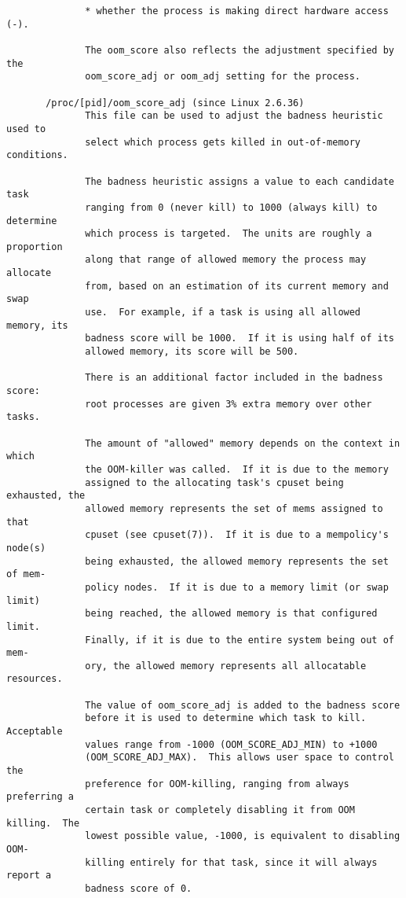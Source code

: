 \documentclass[]{article}
\begin{document}
\begin{verbatim}
              * whether the process is making direct hardware access (-).

              The oom_score also reflects the adjustment specified by the
              oom_score_adj or oom_adj setting for the process.

       /proc/[pid]/oom_score_adj (since Linux 2.6.36)
              This file can be used to adjust the badness heuristic used to
              select which process gets killed in out-of-memory conditions.

              The badness heuristic assigns a value to each candidate task
              ranging from 0 (never kill) to 1000 (always kill) to determine
              which process is targeted.  The units are roughly a proportion
              along that range of allowed memory the process may allocate
              from, based on an estimation of its current memory and swap
              use.  For example, if a task is using all allowed memory, its
              badness score will be 1000.  If it is using half of its
              allowed memory, its score will be 500.

              There is an additional factor included in the badness score:
              root processes are given 3% extra memory over other tasks.

              The amount of "allowed" memory depends on the context in which
              the OOM-killer was called.  If it is due to the memory
              assigned to the allocating task's cpuset being exhausted, the
              allowed memory represents the set of mems assigned to that
              cpuset (see cpuset(7)).  If it is due to a mempolicy's node(s)
              being exhausted, the allowed memory represents the set of mem‐
              policy nodes.  If it is due to a memory limit (or swap limit)
              being reached, the allowed memory is that configured limit.
              Finally, if it is due to the entire system being out of mem‐
              ory, the allowed memory represents all allocatable resources.

              The value of oom_score_adj is added to the badness score
              before it is used to determine which task to kill.  Acceptable
              values range from -1000 (OOM_SCORE_ADJ_MIN) to +1000
              (OOM_SCORE_ADJ_MAX).  This allows user space to control the
              preference for OOM-killing, ranging from always preferring a
              certain task or completely disabling it from OOM killing.  The
              lowest possible value, -1000, is equivalent to disabling OOM-
              killing entirely for that task, since it will always report a
              badness score of 0.


\end{verbatim}
\end{document}
